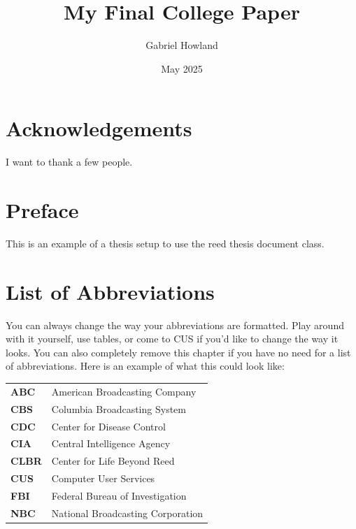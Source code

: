 \documentclass[12pt,twoside]{reedthesis}
\title{My Final College Paper}
\author{Gabriel Howland}
\date{May 2025}
\begin{document}
  \maketitle
  \frontmatter %
  \pagestyle{empty} %

    \chapter*{Acknowledgements}
	I want to thank a few people.

    \chapter*{Preface}
	This is an example of a thesis setup to use the reed thesis document class.
	
	

    \chapter*{List of Abbreviations}
		You can always change the way your abbreviations are formatted. Play around with it yourself, use tables, or come to CUS if you'd like to change the way it looks. You can also completely remove this chapter if you have no need for a list of abbreviations. Here is an example of what this could look like:

	\begin{table}[h]
	\centering %
	\begin{tabular}{ll}
		\textbf{ABC}  	&  American Broadcasting Company \\
		\textbf{CBS}  	&  Columbia Broadcasting System\\
		\textbf{CDC}  	&  Center for Disease Control \\
		\textbf{CIA}  	&  Central Intelligence Agency\\
		\textbf{CLBR} 	&  Center for Life Beyond Reed\\
		\textbf{CUS}  	&  Computer User Services\\
		\textbf{FBI}  	&  Federal Bureau of Investigation\\
		\textbf{NBC}  	&  National Broadcasting Corporation\\
	\end{tabular}
	\end{table}
	
\end{document}
